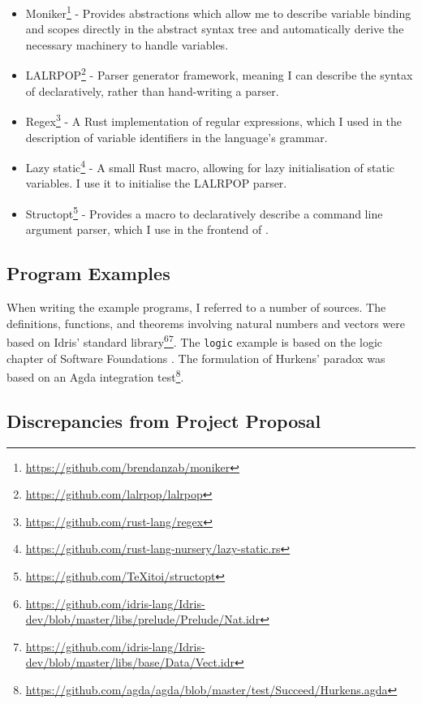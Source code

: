 \documentclass[12pt,a4paper,twoside]{report}
\begin{document}
\begin{itemize}
    \item Moniker\footnote{\url{https://github.com/brendanzab/moniker}} - Provides abstractions which allow me to describe variable binding and scopes directly in the abstract syntax tree and automatically derive the necessary machinery to handle variables.
    \item LALRPOP\footnote{\url{https://github.com/lalrpop/lalrpop}} - Parser generator framework, meaning I can describe the syntax of \pimu{} declaratively, rather than hand-writing a parser.
    \item Regex\footnote{\url{https://github.com/rust-lang/regex}} - A Rust implementation of regular expressions, which I used in the description of variable identifiers in the language's grammar.
    \item Lazy static\footnote{\url{https://github.com/rust-lang-nursery/lazy-static.rs}} - A small Rust macro, allowing for lazy initialisation of static variables.
          I use it to initialise the LALRPOP parser.
    \item Structopt\footnote{\url{https://github.com/TeXitoi/structopt}} - Provides a macro to declaratively describe a command line argument parser, which I use in the frontend of \pimu{}.
\end{itemize}

\subsection{Program Examples}

When writing the \pimu{} example programs, I referred to a number of sources.
The definitions, functions, and theorems involving natural numbers and vectors were based on Idris' \cite{brady13} standard library\footnote{\url{https://github.com/idris-lang/Idris-dev/blob/master/libs/prelude/Prelude/Nat.idr}}\footnote{\url{https://github.com/idris-lang/Idris-dev/blob/master/libs/base/Data/Vect.idr}}.
The \texttt{logic} example is based on the logic chapter of Software Foundations \cite{pierce18}.
The formulation of Hurkens' paradox was based on an Agda \cite{loeh10} integration test\footnote{\url{https://github.com/agda/agda/blob/master/test/Succeed/Hurkens.agda}}.

\subsection{Discrepancies from Project Proposal}
\end{document}
